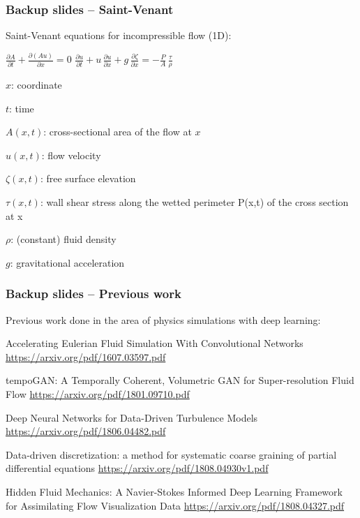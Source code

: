 \begin{frame}
    \frametitle{Backup slides -- Saint-Venant}
\vspace*{0.8cm}

Saint-Venant equations for incompressible flow (1D):

${\frac {\partial A}{\partial t}}+{\frac {\partial \left(Au\right)}{\partial x}}=0$\newline
${\frac {\partial u}{\partial t}}+u\,{\frac {\partial u}{\partial x}}+g\,{\frac {\partial \zeta }{\partial x}}=-{\frac {P}{A}}\,{\frac {\tau }{\rho }}$\newline

\begin{PraesentationAufzaehlung}
\item $x$: coordinate
\item $t$: time
\item $A(x,t)$: cross-sectional area of the flow at $x$
\item $u(x,t)$: flow velocity
\item $\zeta (x,t)$: free surface elevation
\item $\tau (x,t)$: wall shear stress along the wetted perimeter P(x,t) of the cross section at x
\item $\rho$: (constant) fluid density
\item $g$: gravitational acceleration
\end{PraesentationAufzaehlung}

\end{frame}
\clearpage

\begin{frame}
    \frametitle{Backup slides -- Previous work}
\vspace*{0.8cm}

Previous work done in the area of physics simulations with deep learning:

\begin{PraesentationAufzaehlung}
\item Accelerating Eulerian Fluid Simulation With Convolutional Networks \newline \url{https://arxiv.org/pdf/1607.03597.pdf}
\item tempoGAN: A Temporally Coherent, Volumetric GAN for Super-resolution Fluid Flow \newline \url{https://arxiv.org/pdf/1801.09710.pdf}
\item Deep Neural Networks for Data-Driven Turbulence Models \newline \url{https://arxiv.org/pdf/1806.04482.pdf}
\item Data-driven discretization: a method for systematic coarse graining of partial differential equations \newline \url{https://arxiv.org/pdf/1808.04930v1.pdf}
\item Hidden Fluid Mechanics: A Navier-Stokes Informed Deep Learning Framework for Assimilating Flow Visualization Data \newline \url{https://arxiv.org/pdf/1808.04327.pdf}
\end{PraesentationAufzaehlung}

\end{frame}
\clearpage